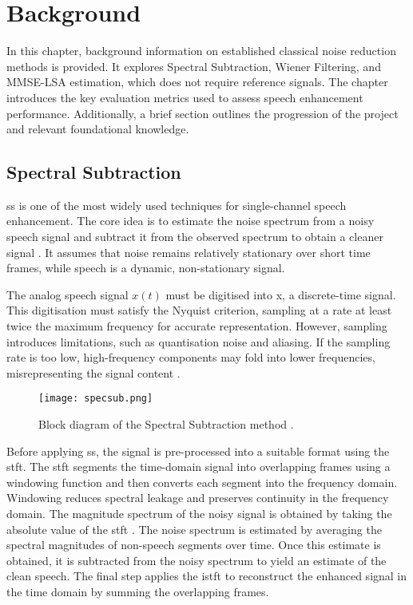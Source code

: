 \graphicspath{{content/chapters/2_background/figures/}}
\chapter{Background}
\label{chp:background}

In this chapter, background information on established classical noise reduction methods is provided. It explores Spectral Subtraction, Wiener Filtering, and MMSE-LSA estimation, which does not require reference signals.  The chapter introduces the key evaluation metrics used to assess speech enhancement performance. Additionally, a brief section outlines the progression of the project and relevant foundational knowledge.

\section{Spectral Subtraction}
\label{sec:spectral_subtraction}

\gls{ss} is one of the most widely used techniques for single-channel speech enhancement. The core idea is to estimate the noise spectrum from a noisy speech signal and subtract it from the observed spectrum to obtain a cleaner signal \cite{loizou2013speech}. It assumes that noise remains relatively stationary over short time frames, while speech is a dynamic, non-stationary signal.

The analog speech signal \(x(t)\) must be digitised into \gls{x}, a discrete-time signal. This digitisation must satisfy the Nyquist criterion, sampling at a rate at least twice the maximum frequency for accurate representation. However, sampling introduces limitations, such as quantisation noise and aliasing. If the sampling rate is too low, high-frequency components may fold into lower frequencies, misrepresenting the signal content \cite{loizou2013speech}.

\begin{figure}[h]
    \centering
    \texttt{[image: specsub.png]}
    \caption{\label{fig:SSBlock} Block diagram of the Spectral Subtraction method \cite{dubey2016evaluation}.}
\end{figure}

Before applying \gls{ss}, the signal is pre-processed into a suitable format using the \gls{stft}. The \gls{stft} segments the time-domain signal into overlapping frames using a windowing function and then converts each segment into the frequency domain. Windowing reduces spectral leakage and preserves continuity in the frequency domain. The magnitude spectrum of the noisy signal is obtained by taking the absolute value of the \gls{stft} \cite{dubey2016evaluation}. The noise spectrum is estimated by averaging the spectral magnitudes of non-speech segments over time. Once this estimate is obtained, it is subtracted from the noisy spectrum to yield an estimate of the clean speech. The final step applies the \gls{istft} to reconstruct the enhanced signal in the time domain by summing the overlapping frames.

